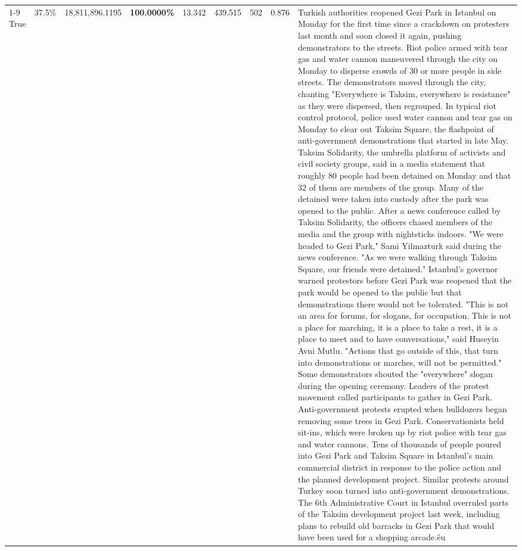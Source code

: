\begin{table}[H]
\begin{tabular}{lllrlllll}
\cline{1-9}
True & 37.5\% & 18,811,896.1195 & \bfseries \color{red} 100.0000\% & 13.342 & 439.515 & 502 & 0.876 & Turkish authorities reopened Gezi Park in Istanbul on Monday for the first time since a crackdown on protesters last month and soon closed it again, pushing demonstrators to the streets. Riot police armed with tear gas and water cannon maneuvered through the city on Monday to disperse crowds of 30 or more people in side streets. The demonstrators moved through the city, chanting "Everywhere is Taksim, everywhere is resistance" as they were dispersed, then regrouped. In typical riot control protocol, police used water cannon and tear gas on Monday to clear out Taksim Square, the flashpoint of anti-government demonstrations that started in late May. Taksim Solidarity, the umbrella platform of activists and civil society groups, said in a media statement that roughly 80 people had been detained on Monday and that 32 of them are members of the group. Many of the detained were taken into custody after the park was opened to the public. After a news conference called by Taksim Solidarity, the officers chased members of the media and the group with nightsticks indoors. "We were headed to Gezi Park," Sami Yilmazturk said during the news conference. "As we were walking through Taksim Square, our friends were detained." Istanbul's governor warned protestors before Gezi Park was reopened that the park would be opened to the public but that demonstrations there would not be tolerated. "This is not an area for forums, for slogans, for occupation. This is not a place for marching, it is a place to take a rest, it is a place to meet and to have conversations," said Huseyin Avni Mutlu. "Actions that go outside of this, that turn into demonstrations or marches, will not be permitted." Some demonstrators shouted the "everywhere" slogan during the opening ceremony. Leaders of the protest movement called participants to gather in Gezi Park. Anti-government protests erupted when bulldozers began removing some trees in Gezi Park. Conservationists held sit-ins, which were broken up by riot police with tear gas and water cannons. Tens of thousands of people poured into Gezi Park and Taksim Square in Istanbul's main commercial district in response to the police action and the planned development project. Similar protests around Turkey soon turned into anti-government demonstrations. The 6th Administrative Court in Istanbul overruled parts of the Taksim development project last week, including plans to rebuild old barracks in Gezi Park that would have been used for a shopping arcade.êu \\

\end{tabular}
\end{table}
